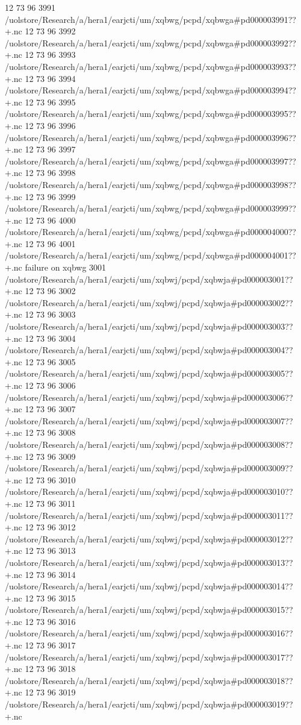 12 73 96
3991
/uolstore/Research/a/hera1/earjcti/um/xqbwg/pcpd/xqbwga#pd000003991??+.nc
12 73 96
3992
/uolstore/Research/a/hera1/earjcti/um/xqbwg/pcpd/xqbwga#pd000003992??+.nc
12 73 96
3993
/uolstore/Research/a/hera1/earjcti/um/xqbwg/pcpd/xqbwga#pd000003993??+.nc
12 73 96
3994
/uolstore/Research/a/hera1/earjcti/um/xqbwg/pcpd/xqbwga#pd000003994??+.nc
12 73 96
3995
/uolstore/Research/a/hera1/earjcti/um/xqbwg/pcpd/xqbwga#pd000003995??+.nc
12 73 96
3996
/uolstore/Research/a/hera1/earjcti/um/xqbwg/pcpd/xqbwga#pd000003996??+.nc
12 73 96
3997
/uolstore/Research/a/hera1/earjcti/um/xqbwg/pcpd/xqbwga#pd000003997??+.nc
12 73 96
3998
/uolstore/Research/a/hera1/earjcti/um/xqbwg/pcpd/xqbwga#pd000003998??+.nc
12 73 96
3999
/uolstore/Research/a/hera1/earjcti/um/xqbwg/pcpd/xqbwga#pd000003999??+.nc
12 73 96
4000
/uolstore/Research/a/hera1/earjcti/um/xqbwg/pcpd/xqbwga#pd000004000??+.nc
12 73 96
4001
/uolstore/Research/a/hera1/earjcti/um/xqbwg/pcpd/xqbwga#pd000004001??+.nc
failure on xqbwg
3001
/uolstore/Research/a/hera1/earjcti/um/xqbwj/pcpd/xqbwja#pd000003001??+.nc
12 73 96
3002
/uolstore/Research/a/hera1/earjcti/um/xqbwj/pcpd/xqbwja#pd000003002??+.nc
12 73 96
3003
/uolstore/Research/a/hera1/earjcti/um/xqbwj/pcpd/xqbwja#pd000003003??+.nc
12 73 96
3004
/uolstore/Research/a/hera1/earjcti/um/xqbwj/pcpd/xqbwja#pd000003004??+.nc
12 73 96
3005
/uolstore/Research/a/hera1/earjcti/um/xqbwj/pcpd/xqbwja#pd000003005??+.nc
12 73 96
3006
/uolstore/Research/a/hera1/earjcti/um/xqbwj/pcpd/xqbwja#pd000003006??+.nc
12 73 96
3007
/uolstore/Research/a/hera1/earjcti/um/xqbwj/pcpd/xqbwja#pd000003007??+.nc
12 73 96
3008
/uolstore/Research/a/hera1/earjcti/um/xqbwj/pcpd/xqbwja#pd000003008??+.nc
12 73 96
3009
/uolstore/Research/a/hera1/earjcti/um/xqbwj/pcpd/xqbwja#pd000003009??+.nc
12 73 96
3010
/uolstore/Research/a/hera1/earjcti/um/xqbwj/pcpd/xqbwja#pd000003010??+.nc
12 73 96
3011
/uolstore/Research/a/hera1/earjcti/um/xqbwj/pcpd/xqbwja#pd000003011??+.nc
12 73 96
3012
/uolstore/Research/a/hera1/earjcti/um/xqbwj/pcpd/xqbwja#pd000003012??+.nc
12 73 96
3013
/uolstore/Research/a/hera1/earjcti/um/xqbwj/pcpd/xqbwja#pd000003013??+.nc
12 73 96
3014
/uolstore/Research/a/hera1/earjcti/um/xqbwj/pcpd/xqbwja#pd000003014??+.nc
12 73 96
3015
/uolstore/Research/a/hera1/earjcti/um/xqbwj/pcpd/xqbwja#pd000003015??+.nc
12 73 96
3016
/uolstore/Research/a/hera1/earjcti/um/xqbwj/pcpd/xqbwja#pd000003016??+.nc
12 73 96
3017
/uolstore/Research/a/hera1/earjcti/um/xqbwj/pcpd/xqbwja#pd000003017??+.nc
12 73 96
3018
/uolstore/Research/a/hera1/earjcti/um/xqbwj/pcpd/xqbwja#pd000003018??+.nc
12 73 96
3019
/uolstore/Research/a/hera1/earjcti/um/xqbwj/pcpd/xqbwja#pd000003019??+.nc
